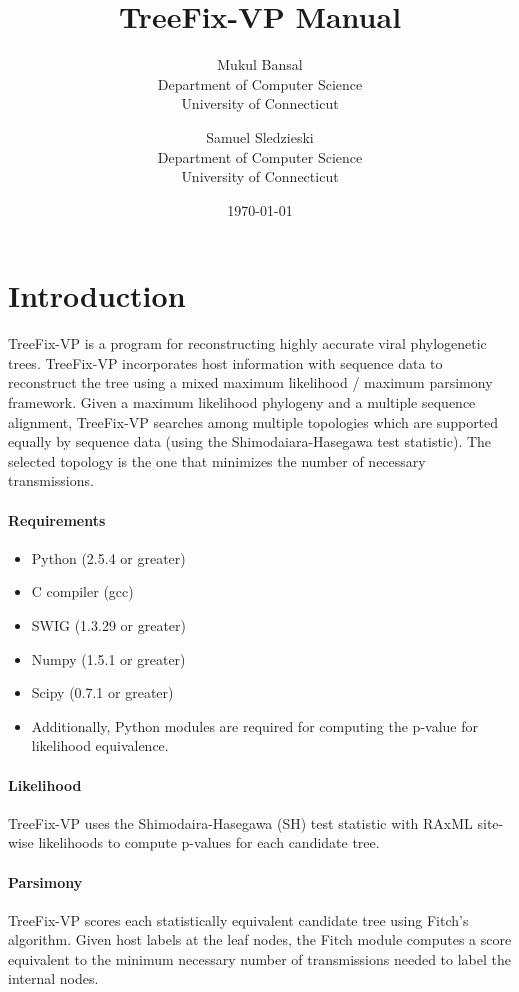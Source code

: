 \documentclass[11pt]{article}
\title{TreeFix-VP Manual}
\author{
    Mukul Bansal \\
        Department of Computer Science \\
        University of Connecticut \\
    \and
    Samuel Sledzieski\\
        Department of Computer Science\\
        University of Connecticut\\
}
\date{\today}
\begin{document}
\maketitle
\tableofcontents
\vspace{10mm}

\section{Introduction}
TreeFix-VP is a program for reconstructing highly accurate viral phylogenetic trees. TreeFix-VP incorporates host information with sequence data to reconstruct the tree using a mixed maximum likelihood / maximum parsimony framework. Given a maximum likelihood phylogeny and a multiple sequence alignment, TreeFix-VP searches among multiple topologies which are supported equally by sequence data (using the Shimodaiara-Hasegawa test statistic). The selected topology is the one that minimizes the number of necessary transmissions.

\paragraph{Requirements}
    \begin{itemize}
        \item Python (2.5.4 or greater)
        \item C compiler (gcc)
        \item SWIG (1.3.29 or greater)
        \item Numpy (1.5.1 or greater)
        \item Scipy (0.7.1 or greater)
        \item Additionally, Python modules are required for computing the p-value for likelihood equivalence.
    \end{itemize}

\paragraph{Likelihood}
TreeFix-VP uses the Shimodaira-Hasegawa (SH) test statistic with RAxML site-wise likelihoods to compute
p-values for each candidate tree.

\paragraph{Parsimony}
TreeFix-VP scores each statistically equivalent candidate tree using Fitch's algorithm.
Given host labels at the leaf nodes, the Fitch module computes a score equivalent to the
minimum necessary number of transmissions needed to label the internal nodes.
\end{document}
